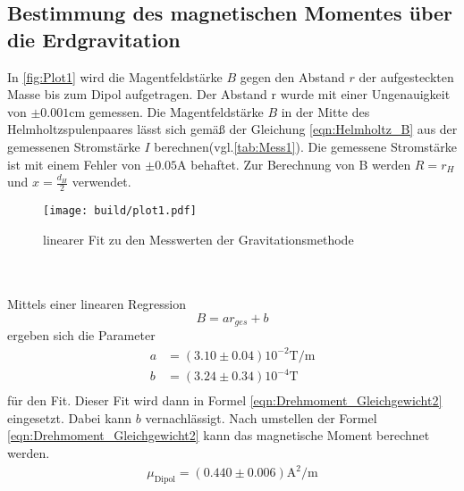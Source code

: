 \subsection{Bestimmung des magnetischen Momentes über die Erdgravitation}
\label{AuswertungZu1}
In \autoref{fig:Plot1} wird die Magentfeldstärke $B$ gegen den Abstand $r$ der aufgesteckten Masse bis zum Dipol aufgetragen. Der Abstand r wurde mit einer Ungenauigkeit von $\pm 0.001\unit{\centi\metre}$ gemessen.
Die Magentfeldstärke $B$ in der Mitte des Helmholtzspulenpaares lässt sich gemäß der Gleichung \eqref{eqn:Helmholtz_B} aus der gemessenen Stromstärke $I$  berechnen(vgl.\autoref{tab:Mess1}). 
Die gemessene Stromstärke ist mit einem Fehler von $\pm 0.05\unit{\ampere}$ behaftet. Zur Berechnung von B werden $R = r_H$ und $x = \frac{d_H}{2}$ verwendet.
\begin{figure}
    \centering
    \texttt{[image: build/plot1.pdf]}
    \caption{linearer Fit \cite{scipy} zu den Messwerten der Gravitationsmethode}
    \label{fig:Plot1}
\end{figure} 
\\
\\
Mittels einer linearen Regression \cite{scipy} 
\begin{equation*}
    B = ar_{ges} + b
\end{equation*}
ergeben sich die Parameter 
\begin{align*}
    a &= (3.10 \pm 0.04) 10^{-2}\unit{\tesla\per\metre}\\
    b &= (3.24 \pm 0.34) 10^{-4} \unit{\tesla}\\
\end{align*}
für den Fit. Dieser Fit wird dann in Formel \eqref{eqn:Drehmoment_Gleichgewicht2} eingesetzt. Dabei kann $b$ vernachlässigt. Nach umstellen der Formel 
\eqref{eqn:Drehmoment_Gleichgewicht2} kann das magnetische Moment berechnet werden.
\begin{align*}
    \mu_{\text{Dipol}} = (0.440 \pm 0.006) \unit{\square\ampere\per\metre}\\
\end{align*}
